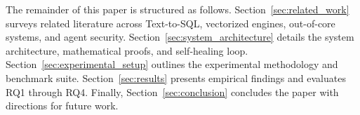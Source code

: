 The remainder of this paper is structured as follows. Section~\ref{sec:related_work} surveys related literature across Text-to-SQL, vectorized engines, out-of-core systems, and agent security. Section~\ref{sec:system_architecture} details the system architecture, mathematical proofs, and self-healing loop. Section~\ref{sec:experimental_setup} outlines the experimental methodology and benchmark suite. Section~\ref{sec:results} presents empirical findings and evaluates RQ1 through RQ4. Finally, Section~\ref{sec:conclusion} concludes the paper with directions for future work.
